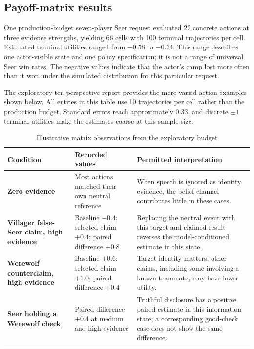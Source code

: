 \documentclass[11pt,a4paper]{article}
\begin{document}
\subsection{Payoff-matrix results}

One production-budget seven-player Seer request evaluated 22 concrete actions at three evidence strengths, yielding 66 cells with 100 terminal trajectories per cell. Estimated terminal utilities ranged from $-0.58$ to $-0.34$. This range describes one actor-visible state and one policy specification; it is not a range of universal Seer win rates. The negative values indicate that the actor's camp lost more often than it won under the simulated distribution for this particular request.

The exploratory ten-perspective report provides the more varied action examples shown below. All entries in this table use 10 trajectories per cell rather than the production budget. Standard errors reach approximately 0.33, and discrete $\pm1$ terminal utilities make the estimates coarse at this sample size.

\begin{table}[htbp]
\centering
\caption{Illustrative matrix observations from the exploratory budget}
\begin{tabularx}{\textwidth}{>{\bfseries}p{}p{}Y}
\toprule
Condition & Recorded values & Permitted interpretation \\
\midrule
Zero evidence & Most actions matched their own neutral reference & When speech is ignored as identity evidence, the belief channel contributes little in these cases. \\
Villager false-Seer claim, high evidence & Baseline $-0.4$; selected claim $+0.4$; paired difference $+0.8$ & Replacing the neutral event with this target and claimed result reverses the model-conditioned estimate in this state. \\
Werewolf counterclaim, high evidence & Baseline $+0.6$; selected claim $+1.0$; paired difference $+0.4$ & Target identity matters; other claims, including some involving a known teammate, may have lower utility. \\
Seer holding a Werewolf check & Paired difference $+0.4$ at medium and high evidence & Truthful disclosure has a positive paired estimate in this information state; a corresponding good-check case does not show the same difference. \\
\bottomrule
\end{tabularx}
\end{table}
\end{document}
